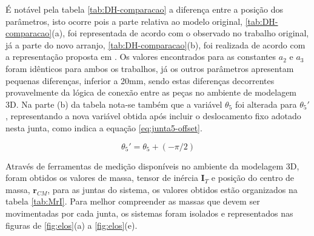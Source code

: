 É notável pela tabela \ref{tab:DH-comparacao} a diferença entre a posição dos 
parâmetros, isto ocorre pois a parte relativa ao modelo original, \ref{tab:DH-comparacao}(a),
foi representada de acordo com o observado no trabalho original, já a
parte do novo arranjo, \ref{tab:DH-comparacao}(b), foi realizada de acordo com 
a representação proposta em \cite{craig2009introduction}. Os valores encontrados para as 
constantes $a_2$ e $a_3$ foram idênticos para ambos os trabalhos, já os outros parâmetros
apresentam pequenas diferenças, inferior a 20mm, sendo estas diferenças decorrentes 
provavelmente da lógica de conexão entre as peças no ambiente de modelagem 3D. 
Na parte (b) da tabela nota-se também que a variável $\theta_5$ foi alterada 
para $\theta_5'$, representando a nova variável obtida após incluir o deslocamento 
fixo adotado nesta junta, como indica a equação \ref{eq:junta5-offset}.

\vspace{-2ex}
\begin{equation}
    \theta_5' = \theta_5 + (-\pi/2)
    \label{eq:junta5-offset}
\end{equation}

Através de ferramentas de medição disponíveis no ambiente da modelagem 3D, foram obtidos os valores de massa, tensor de inércia $\textbf{I}_T$ 
e posição do centro de massa, $\textbf{r}_{CM}$, para as juntas do sistema, os valores obtidos estão organizados na tabela \ref{tab:MrI}. 
Para melhor compreender as massas que devem ser movimentadas por 
cada junta, os sistemas foram isolados e representados nas figuras de \ref{fig:elos}(a) a \ref{fig:elos}(e).

